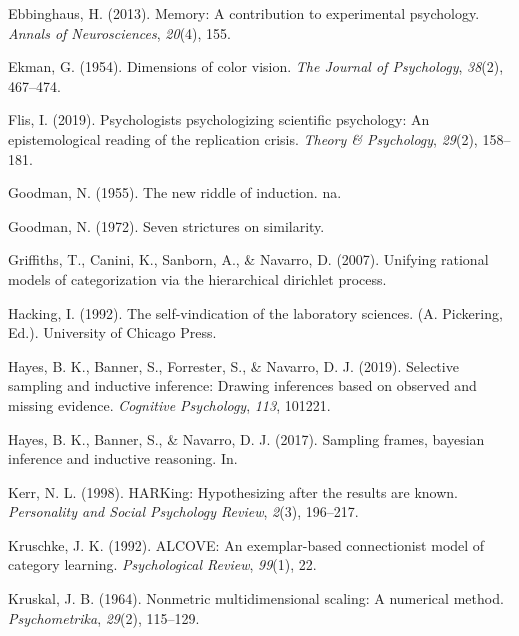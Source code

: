 \documentclass[
  english,
  doc]{apa6}
\begin{document}
\leavevmode\hypertarget{ref-ebbinghaus2013memory}{}%
Ebbinghaus, H. (2013). Memory: A contribution to experimental psychology. \emph{Annals of Neurosciences}, \emph{20}(4), 155.

\leavevmode\hypertarget{ref-ekman1954dimensions}{}%
Ekman, G. (1954). Dimensions of color vision. \emph{The Journal of Psychology}, \emph{38}(2), 467--474.

\leavevmode\hypertarget{ref-Flis2019}{}%
Flis, I. (2019). Psychologists psychologizing scientific psychology: An epistemological reading of the replication crisis. \emph{Theory \& Psychology}, \emph{29}(2), 158--181.

\leavevmode\hypertarget{ref-goodman1955new}{}%
Goodman, N. (1955). The new riddle of induction. na.

\leavevmode\hypertarget{ref-goodman1972seven}{}%
Goodman, N. (1972). Seven strictures on similarity.

\leavevmode\hypertarget{ref-griffiths2007unifying}{}%
Griffiths, T., Canini, K., Sanborn, A., \& Navarro, D. (2007). Unifying rational models of categorization via the hierarchical dirichlet process.

\leavevmode\hypertarget{ref-hacking1992self}{}%
Hacking, I. (1992). The self-vindication of the laboratory sciences. (A. Pickering, Ed.). University of Chicago Press.

\leavevmode\hypertarget{ref-hayes2019selective}{}%
Hayes, B. K., Banner, S., Forrester, S., \& Navarro, D. J. (2019). Selective sampling and inductive inference: Drawing inferences based on observed and missing evidence. \emph{Cognitive Psychology}, \emph{113}, 101221.

\leavevmode\hypertarget{ref-hayes2017sampling}{}%
Hayes, B. K., Banner, S., \& Navarro, D. J. (2017). Sampling frames, bayesian inference and inductive reasoning. In.

\leavevmode\hypertarget{ref-kerr1998harking}{}%
Kerr, N. L. (1998). HARKing: Hypothesizing after the results are known. \emph{Personality and Social Psychology Review}, \emph{2}(3), 196--217.

\leavevmode\hypertarget{ref-kruschke1992alcove}{}%
Kruschke, J. K. (1992). ALCOVE: An exemplar-based connectionist model of category learning. \emph{Psychological Review}, \emph{99}(1), 22.

\leavevmode\hypertarget{ref-kruskal1964nonmetric}{}%
Kruskal, J. B. (1964). Nonmetric multidimensional scaling: A numerical method. \emph{Psychometrika}, \emph{29}(2), 115--129.
\end{document}
